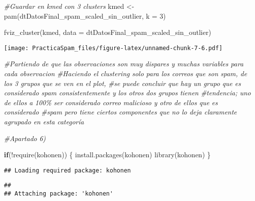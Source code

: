 \documentclass[
]{article}
\newenvironment{Shaded}{\begin{snugshade}}{\end{snugshade}}
\newcommand{\AttributeTok}[1]{\textcolor[rgb]{0.77,0.63,0.00}{#1}}
\newcommand{\CommentTok}[1]{\textcolor[rgb]{0.56,0.35,0.01}{\textit{#1}}}
\newcommand{\ControlFlowTok}[1]{\textcolor[rgb]{0.13,0.29,0.53}{\textbf{#1}}}
\newcommand{\DecValTok}[1]{\textcolor[rgb]{0.00,0.00,0.81}{#1}}
\newcommand{\FunctionTok}[1]{\textcolor[rgb]{0.00,0.00,0.00}{#1}}
\newcommand{\NormalTok}[1]{#1}
\newcommand{\OtherTok}[1]{\textcolor[rgb]{0.56,0.35,0.01}{#1}}
\newcommand{\SpecialCharTok}[1]{\textcolor[rgb]{0.00,0.00,0.00}{#1}}
\newcommand{\StringTok}[1]{\textcolor[rgb]{0.31,0.60,0.02}{#1}}
\begin{document}
\begin{Shaded}
\begin{Highlighting}[]
  \CommentTok{\#Guardar en kmed con 3 clusters}
\NormalTok{  kmed }\OtherTok{\textless{}{-}} \FunctionTok{pam}\NormalTok{(dtDatosFinal\_spam\_scaled\_sin\_outlier, }\AttributeTok{k =} \DecValTok{3}\NormalTok{)}
  
  \FunctionTok{fviz\_cluster}\NormalTok{(kmed, }\AttributeTok{data =}\NormalTok{ dtDatosFinal\_spam\_scaled\_sin\_outlier)}
\end{Highlighting}
\end{Shaded}

\texttt{[image: PracticaSpam\_files/figure-latex/unnamed-chunk-7-6.pdf]}

\begin{Shaded}
\begin{Highlighting}[]
  \CommentTok{\#Partiendo de que las observaciones son muy dispares y muchas variables para cada observacion}
  \CommentTok{\#Haciendo el clustering solo para los correos que son spam, de los 3 grupos que se ven en el plot,}
  \CommentTok{\#se puede concluir que hay un grupo que es considerado spam consistentemente y los otros dos grupos tienen}
  \CommentTok{\#tendencia; uno de ellos a 100\% ser considerado correo malicioso y otro de ellos que es considerado}
  \CommentTok{\#spam pero tiene ciertos componentes que no lo deja claramente agrupado en esta categoría}
\end{Highlighting}
\end{Shaded}

\begin{Shaded}
\begin{Highlighting}[]
  \CommentTok{\#Apartado 6)}

  \ControlFlowTok{if}\NormalTok{(}\SpecialCharTok{!}\FunctionTok{require}\NormalTok{(}\StringTok{\textquotesingle{}kohonen\textquotesingle{}}\NormalTok{)) \{}
    \FunctionTok{install.packages}\NormalTok{(}\StringTok{\textquotesingle{}kohonen\textquotesingle{}}\NormalTok{)}
    \FunctionTok{library}\NormalTok{(}\StringTok{\textquotesingle{}kohonen\textquotesingle{}}\NormalTok{)}
\NormalTok{  \}}
\end{Highlighting}
\end{Shaded}

\begin{verbatim}
## Loading required package: kohonen
\end{verbatim}

\begin{verbatim}
## 
## Attaching package: 'kohonen'
\end{verbatim}
\end{document}
